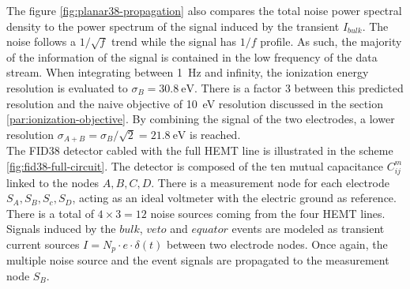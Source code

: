 The figure \ref{fig:planar38-propagation} also compares the total noise power spectral density to the power spectrum of the signal induced by the transient $I_{bulk}$. The noise follows a $1/\sqrt{f}$ trend while the signal has $1/f$ profile. As such, the majority of the information of the signal is contained in the low frequency of the data stream. When integrating between \SI{1}{\Hz} and infinity, the ionization energy resolution is evaluated to $\sigma_B=\SI{30.8}{\eV}$. There is a factor 3 between this predicted resolution and the naive objective of \SI{10}{\eV} resolution discussed in the section \ref{par:ionization-objective}. By combining the signal of the two electrodes, a lower resolution $\sigma_{A+B} = \sigma_B / \sqrt{2} = \SI{21.8}{\eV}$ is reached. 
\\

The FID38 detector cabled with the full HEMT line is illustrated in the scheme \ref{fig:fid38-full-circuit}. The detector is composed of the ten mutual capacitance $C_{ij}^m$ linked to the nodes $A,B,C,D$. There is a measurement node for each electrode $S_A, S_B, S_c, S_D$, acting as an ideal voltmeter with the electric ground as reference. There is a total of $4\times3=12$ noise sources coming from the four HEMT lines. Signals induced by the $bulk$, $veto$ and $equator$ events are modeled as transient current sources $I=N_p \cdot e \cdot \delta(t)$ between two electrode nodes. Once again, the multiple noise source and the event signals are propagated to the measurement node $S_B$.


